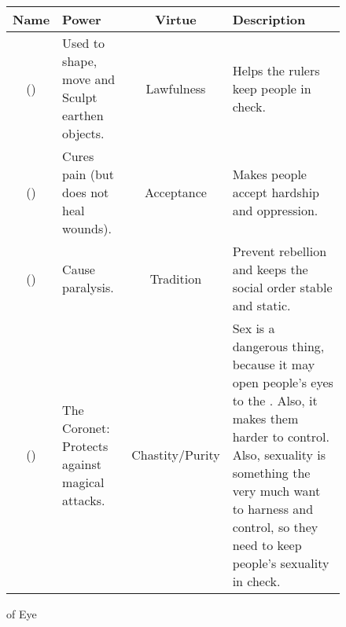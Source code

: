 \newcommand{\sephitem}[5]{#1 (#2) & #3 & #4 & #5 \\\hline}

\newenvironment{sephirahlist}[1]{%
  \begingroup
  \scriptsize
  \begin{figure}
  \caption{\Sephiroth{} of #1}
  \begin{tabular}{|c|p{4cm}|c|p{6cm}|}
  \hline
  \textbf{Name} & \textbf{Power} & \textbf{Virtue} & \textbf{Description} 
  \\
  \hline
  \hline
}{%
  \end{tabular}
  \end{figure}
  \endgroup
}





\begin{comment}
\subsubsection{\Mor, the Eye}
\end{comment}
\begin{sephirahlist}{Eye}
\sephitem
  {\Cushed}
  {\male}
  {Used to shape, move and Sculpt earthen objects.}
  {Lawfulness}
  {Helps the rulers keep people in check. }
\sephitem
  {\Omariel}
  {\female}
  {Cures pain (but does not heal wounds).}
  {Acceptance}
  {Makes people accept hardship and oppression.}
\sephitem
  {\Yemared}
  {\female}
  {Cause paralysis.}
  {Tradition}
  {Prevent rebellion and keeps the social order stable and static.}
\sephitem
  {\Yeziel}
  {\male}
  {The Coronet: Protects against magical attacks.}
  {Chastity/Purity}
  {Sex is a dangerous thing, because it may open people's eyes to the \hs{Beyond}. Also, it makes them harder to control. Also, \human{} sexuality is something the \banes{} very much want to harness and control, so they need \Yeziel{} to keep people's sexuality in check. }
\end{sephirahlist}




